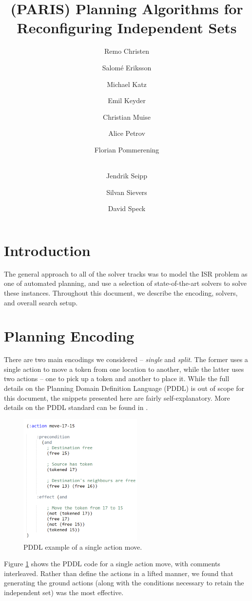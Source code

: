 \documentclass{article}
\date{}
\title{(PARIS) Planning Algorithms for \\ Reconfiguring Independent Sets}
\author[1]{Remo Christen}
\author[1]{Salomé Eriksson}
\author[2]{Michael Katz}
\author[3]{Emil Keyder}
\author[4]{Christian Muise}
\author[4]{Alice Petrov}
\author[1]{Florian Pommerening}
\author[5]{\\ Jendrik Seipp}
\author[1]{Silvan Sievers}
\author[6]{David Speck}
\affil[1]{University of Basel}
\affil[2]{IBM T.J. Watson Research Center}
\affil[3]{Invitae}
\affil[4]{Queen's University}
\affil[5]{Linköping University}
\affil[6]{University of Freiburg}
\renewcommand{\cite}[1]{\citep{#1}}
\begin{document}
\maketitle

\section{Introduction}
The general approach to all of the solver tracks was to model the ISR problem as one of automated planning, and use a selection of state-of-the-art solvers to solve these instances. Throughout this document, we describe the encoding, solvers, and overall search setup.

\section{Planning Encoding}

There are two main encodings we considered -- \textit{single} and \textit{split}. The former uses a single action to move a token from one location to another, while the latter uses two actions -- one to pick up a token and another to place it. While the full details on the Planning Domain Definition Language (PDDL) is out of scope for this document, the snippets presented here are fairly self-explanatory. More details on the PDDL standard can be found in \cite{pddlbook}.

\begin{figure}
    \centering
    \includegraphics[width=0.55\textwidth]{figures/move-single}
    \caption{PDDL example of a single action move.}
    \label{fig:move-single}
\end{figure}

Figure \ref{fig:move-single} shows the PDDL code for a single action move, with comments interleaved. Rather than define the actions in a lifted manner, we found that generating the ground actions (along with the conditions necessary to retain the independent set) was the most effective.
\end{document}
